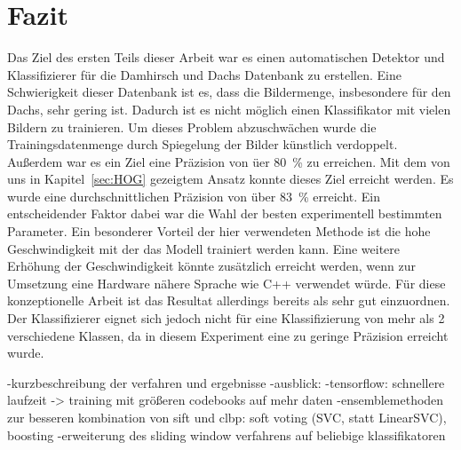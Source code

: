 \section{Fazit}
\label{sec:fazit}
Das Ziel des ersten Teils dieser Arbeit war es einen automatischen Detektor und Klassifizierer für die Damhirsch und Dachs Datenbank zu erstellen. Eine Schwierigkeit dieser Datenbank ist es, dass die Bildermenge, insbesondere für den Dachs, sehr gering ist. Dadurch ist es nicht möglich einen Klassifikator mit vielen Bildern zu trainieren. Um dieses Problem abzuschwächen wurde die Trainingsdatenmenge durch Spiegelung der Bilder künstlich verdoppelt. Außerdem war es ein Ziel eine Präzision von üer 80~\% zu erreichen. Mit dem von uns in Kapitel~\ref{sec:HOG} gezeigtem Ansatz konnte dieses Ziel erreicht werden. Es wurde eine durchschnittlichen Präzision von über 83~\% erreicht. Ein entscheidender Faktor dabei war die Wahl der besten experimentell bestimmten Parameter. Ein besonderer Vorteil der hier verwendeten Methode ist die hohe Geschwindigkeit mit der das Modell trainiert werden kann. Eine weitere Erhöhung der Geschwindigkeit könnte zusätzlich erreicht werden, wenn zur Umsetzung eine Hardware nähere Sprache wie C++ verwendet würde. Für diese konzeptionelle Arbeit ist das Resultat allerdings bereits als sehr gut einzuordnen. Der Klassifizierer eignet sich jedoch nicht für eine Klassifizierung von mehr als 2 verschiedene Klassen, da in diesem Experiment eine zu geringe Präzision erreicht wurde. 

-kurzbeschreibung der verfahren und ergebnisse
-ausblick:
	-tensorflow: schnellere laufzeit -> training mit größeren codebooks auf mehr daten
	-ensemblemethoden zur besseren kombination von sift und clbp: soft voting (SVC, statt LinearSVC), boosting
	-erweiterung des sliding window verfahrens auf beliebige klassifikatoren